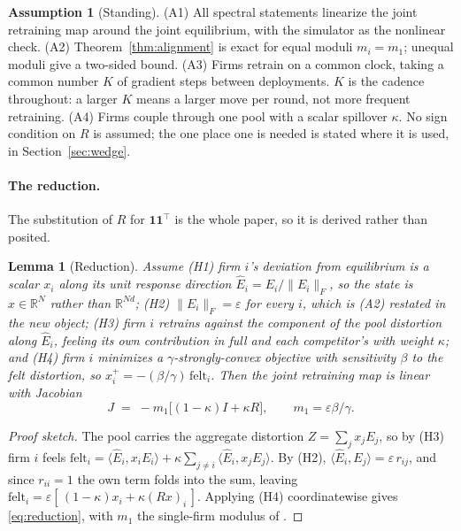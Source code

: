 \documentclass{article}
\theoremstyle{plain}
\newtheorem{lemma}[theorem]{Lemma}
\theoremstyle{definition}
\newtheorem{assumption}{Assumption}
\begin{document}
\begin{assumption}[Standing]
\label{ass:standing}
(A1) All spectral statements linearize the joint retraining map around the joint equilibrium, with the simulator as the nonlinear check. (A2) Theorem~\ref{thm:alignment} is exact for equal moduli $m_i = m_1$; unequal moduli give a two-sided bound. (A3) Firms retrain on a common clock, taking a common number $K$ of gradient steps between deployments. $K$ is the cadence throughout: a larger $K$ means a larger move per round, not more frequent retraining. (A4) Firms couple through one pool with a scalar spillover $\kappa$. No sign condition on $R$ is assumed; the one place one is needed is stated where it is used, in Section~\ref{sec:wedge}.
\end{assumption}

\paragraph{The reduction.}
The substitution of $R$ for $\mathbf{1}\mathbf{1}^{\top}$ is the whole paper, so it is derived rather than posited.


\begin{lemma}[Reduction]
\label{lem:reduction}
Assume \textup{(H1)} firm $i$'s deviation from equilibrium is a scalar $x_i$ along its unit response direction $\hat{E}_i = E_i/\|E_i\|_F$, so the state is $x \in \mathbb{R}^N$ rather than $\mathbb{R}^{Nd}$; \textup{(H2)} $\|E_i\|_F = \varepsilon$ for every $i$, which is \textup{(A2)} restated in the new object; \textup{(H3)} firm $i$ retrains against the component of the pool distortion along $\hat{E}_i$, feeling its own contribution in full and each competitor's with weight $\kappa$; and \textup{(H4)} firm $i$ minimizes a $\gamma$-strongly-convex objective with sensitivity $\beta$ to the felt distortion, so $x_i^{+} = -(\beta/\gamma)\,\mathrm{felt}_i$. Then the joint retraining map is linear with Jacobian
\begin{equation}
\label{eq:reduction}
J \;=\; -m_1\bigl[(1-\kappa)I + \kappa R\bigr], \qquad m_1 = \varepsilon\beta/\gamma .
\end{equation}
\end{lemma}

\begin{proof}[Proof sketch]
The pool carries the aggregate distortion $Z = \sum_j x_j E_j$, so by (H3) firm $i$ feels $\mathrm{felt}_i = \langle \hat{E}_i, x_i E_i\rangle + \kappa\sum_{j\neq i}\langle \hat{E}_i, x_j E_j\rangle$. By (H2), $\langle \hat{E}_i, E_j\rangle = \varepsilon\, r_{ij}$, and since $r_{ii}=1$ the own term folds into the sum, leaving $\mathrm{felt}_i = \varepsilon[\,(1-\kappa)x_i + \kappa (Rx)_i\,]$. Applying (H4) coordinatewise gives \eqref{eq:reduction}, with $m_1$ the single-firm modulus of \citet{perdomo2020}.
\end{proof}
\end{document}
